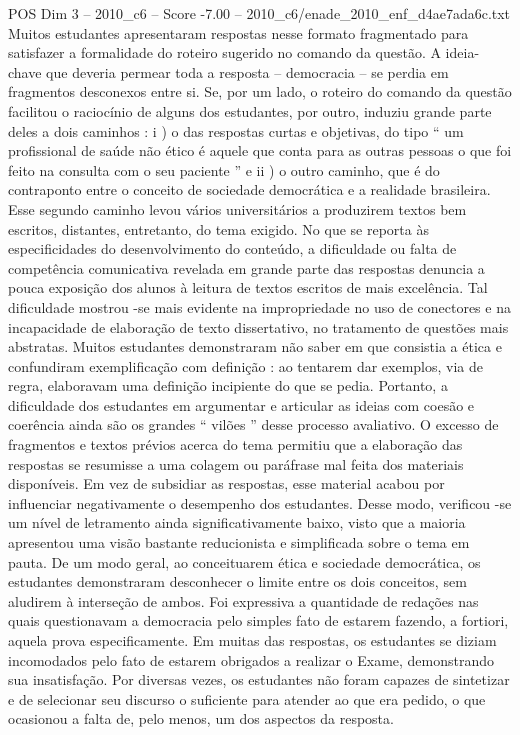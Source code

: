 \begin{textsample}{POS Dim 3 – 2010\_c6 – Score -7.00 – 2010\_c6/enade\_2010\_enf\_d4ae7ada6c.txt}
Muitos estudantes apresentaram respostas nesse formato fragmentado para satisfazer a formalidade do roteiro sugerido no comando da questão.
A ideia-chave que deveria permear toda a resposta – democracia – se perdia em fragmentos desconexos entre si.
Se, por um lado, o roteiro do comando da questão facilitou o raciocínio de alguns dos estudantes, por outro, induziu grande parte deles a dois caminhos : i ) o das respostas curtas e objetivas, do tipo “ um profissional de saúde não ético é aquele que conta para as outras pessoas o que foi feito na consulta com o seu paciente ” e ii ) o outro caminho, que é do contraponto entre o conceito de sociedade democrática e a realidade brasileira.
Esse segundo caminho levou vários universitários a produzirem textos bem escritos, distantes, entretanto, do tema exigido.
No que se reporta às especificidades do desenvolvimento do conteúdo, a dificuldade ou falta de competência comunicativa revelada em grande parte das respostas denuncia a pouca exposição dos alunos à leitura de textos escritos de mais excelência.
Tal dificuldade mostrou -se mais evidente na impropriedade no uso de conectores e na incapacidade de elaboração de texto dissertativo, no tratamento de questões mais abstratas.
Muitos estudantes demonstraram não saber em que consistia a ética e confundiram exemplificação com definição : ao tentarem dar exemplos, via de regra, elaboravam uma definição incipiente do que se pedia.
Portanto, a dificuldade dos estudantes em argumentar e articular as ideias com coesão e coerência ainda são os grandes “ vilões ” desse processo avaliativo.
O excesso de fragmentos e textos prévios acerca do tema permitiu que a elaboração das respostas se resumisse a uma colagem ou paráfrase mal feita dos materiais disponíveis.
Em vez de subsidiar as respostas, esse material acabou por influenciar negativamente o desempenho dos estudantes.
Desse modo, verificou -se um nível de letramento ainda significativamente baixo, visto que a maioria apresentou uma visão bastante reducionista e simplificada sobre o tema em pauta.
De um modo geral, ao conceituarem ética e sociedade democrática, os estudantes demonstraram desconhecer o limite entre os dois conceitos, sem aludirem à interseção de ambos.
Foi expressiva a quantidade de redações nas quais questionavam a democracia pelo simples fato de estarem fazendo, a fortiori, aquela prova especificamente.
Em muitas das respostas, os estudantes se diziam incomodados pelo fato de estarem obrigados a realizar o Exame, demonstrando sua insatisfação.
Por diversas vezes, os estudantes não foram capazes de sintetizar e de selecionar seu discurso o suficiente para atender ao que era pedido, o que ocasionou a falta de, pelo menos, um dos aspectos da resposta.

\end{textsample}
